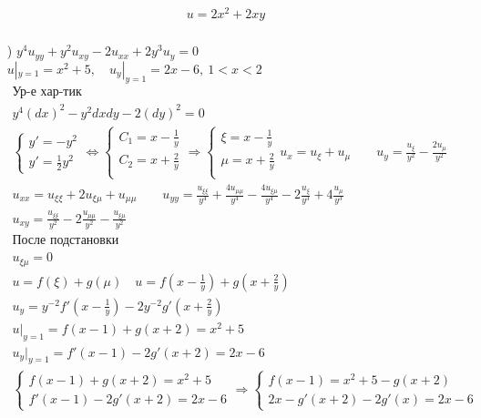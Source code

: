 \begin{enumerate}
\begin{gather*}
    \boxed{u=2x^{2}+2xy} \\
  \end{gather*} \newpage
\item[\text{д})] $y^{4}u_{yy}+y^{2}u_{xy}-2u_{xx}+2y^{3}u_{y}=0$ \\
  $u|_{y=1}=x^{2}+5, \quad u_{y}|_{y=1}=2x-6, \ 1<x<2$ \\
  \begin{gather*}
    \text{Ур-е хар-тик} \\
    y^{4}(dx)^{2}-y^{2}dxdy-2(dy)^{2}=0 \\
    \begin{cases}
      y' = -y^{2} \\ y' =\frac{1}{2}y^{2} 
    \end{cases} \Leftrightarrow
    \begin{cases}
      C_{1} = x - \frac{1}{y} \\ C_{2} = x + \frac{2}{y} \\
    \end{cases} \Rightarrow
    \begin{cases}
      \xi = x - \frac{1}{y} \\ \mu = x + \frac{2}{y} \\
    \end{cases}
  u_{x} = u_{\xi} +u_{\mu} \qquad u_{y} = \frac{u_{\xi}}{y^{2}} - \frac{2u_{\mu}}{y^{2}} \\
  u_{xx}=u_{\xi\xi}+2u_{\xi\mu}+u_{\mu\mu} \qquad u_{yy}= \frac{u_{\xi\xi}}{y^{4}}+ \frac{4u_{\mu\mu}}{y^{4}}
  - \frac{4u_{\xi\mu}}{y^{4}}-2 \frac{u_{\xi}}{y^{3}}+ 4 \frac{u_{\mu}}{y^{3}} \\
  u_{xy}= \frac{u_{\xi\xi}}{y^{2}} - 2 \frac{u_{\mu\mu}}{y^{2}} - \frac{u_{\xi\mu}}{y^{2}} \\
  \text{После подстановки} \\
  u_{\xi\mu} = 0 \\
  u = f(\xi)+g(\mu) \quad u = f(x - \frac{1}{y})+g(x+ \frac{2}{y}) \\
  u_{y}=y^{-2}f'(x- \frac{1}{y})-2y^{-2}g'(x+ \frac{2}{y}) \\
  u|_{y=1}=f(x-1)+g(x+2)=x^{2}+5 \\ u_{y}|_{y=1}=f'(x-1)-2g'(x+2)=2x-6 \\
  \begin{cases}
    f(x-1)+g(x+2)=x^{2}+5 \\ f'(x-1)-2g'(x+2)=2x-6
  \end{cases} \Rightarrow \begin{cases}
    f(x-1) = x^{2}+5-g(x+2) \\ 2x-g'(x+2)-2g'(x)=2x-6

\end{cases}
\end{gather*}
\end{enumerate}
